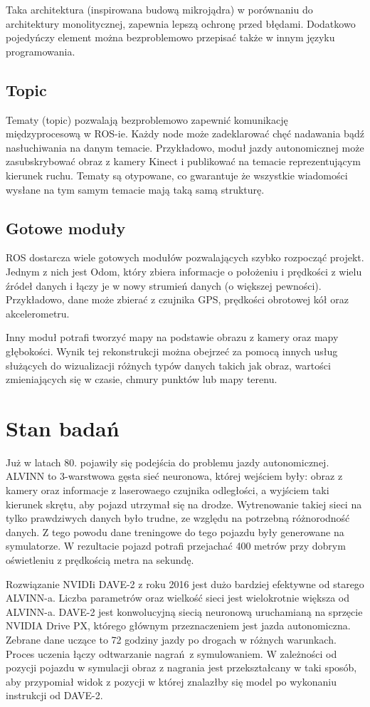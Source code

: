 Taka architektura (inspirowana budową mikrojądra) w porównaniu do architektury monolitycznej, zapewnia lepszą ochronę przed błędami. Dodatkowo pojedyńczy element można
bezproblemowo przepisać także w innym języku programowania.
\subsection{Topic}
Tematy (topic) pozwalają bezproblemowo zapewnić komunikację międzyprocesową
w ROS-ie. Każdy node może zadeklarować chęć nadawania bądź nasłuchiwania na
danym temacie. Przykładowo, moduł jazdy autonomicznej może zasubskrybować
obraz z kamery Kinect i publikować na temacie reprezentującym kierunek ruchu.
Tematy są otypowane, co gwarantuje że wszystkie wiadomości wysłane na tym
samym temacie mają taką samą strukturę.
\subsection{Gotowe moduły}
ROS dostarcza wiele gotowych modułów pozwalających szybko rozpocząć projekt.
Jednym z nich jest Odom, który zbiera informacje o położeniu i prędkości 
z wielu źródeł danych i łączy je w nowy strumień danych (o większej pewności). Przykładowo, 
dane może zbierać z czujnika GPS, prędkości obrotowej kół oraz akcelerometru.

Inny moduł potrafi tworzyć mapy na podstawie obrazu z kamery oraz mapy głębokości.
Wynik tej rekonstrukcji można obejrzeć za pomocą innych usług służących do 
wizualizacji różnych typów danych takich jak obraz, wartości zmieniających się
w czasie, chmury punktów lub mapy terenu.
\section{Stan badań}
Już w latach 80. pojawiły się podejścia do problemu jazdy autonomicznej. 
ALVINN to 3-warstwowa gęsta sieć neuronowa\cite{alvinn}, której wejściem były: obraz z kamery oraz
informacje z laserowaego czujnika odległości, a wyjściem taki kierunek skrętu, aby pojazd
utrzymał się na drodze. Wytrenowanie takiej sieci na tylko prawdziwych danych 
było trudne, ze względu na potrzebną różnorodność danych. Z tego powodu dane treningowe
do tego pojazdu były generowane na symulatorze. W rezultacie pojazd potrafi przejachać 400 metrów przy dobrym oświetleniu z prędkością metra na sekundę.

Rozwiązanie NVIDIi DAVE-2 z roku 2016 jest dużo bardziej efektywne od starego ALVINN-a\cite{nvidia}. Liczba parametrów
oraz wielkość sieci jest wielokrotnie większa od ALVINN-a. DAVE-2 jest konwolucyjną siecią neuronową
uruchamianą na sprzęcie NVIDIA Drive PX, którego głównym przeznaczeniem jest jazda autonomiczna. Zebrane dane uczące to 72 godziny jazdy po drogach w różnych warunkach.
Proces uczenia łączy odtwarzanie nagrań z symulowaniem. W zależności od pozycji
pojazdu w symulacji obraz z nagrania jest przekształcany w taki sposób, aby przypomiał widok z pozycji
w której znalazłby się model po wykonaniu instrukcji od DAVE-2.

